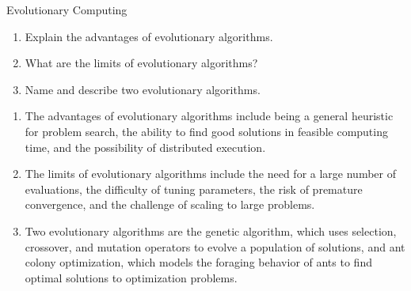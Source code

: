 \documentclass{article}
\begin{document}
\begin{exercise}{Evolutionary Computing}
  \begin{enumerate}
    \item Explain the advantages of evolutionary algorithms.
    \item What are the limits of evolutionary algorithms?
    \item Name and describe two evolutionary algorithms.
  \end{enumerate}

  \begin{solution}
    \begin{enumerate}
      \item The advantages of evolutionary algorithms include being a general heuristic for problem search, the ability to find good solutions in feasible computing time, and the possibility of distributed execution.
      \item The limits of evolutionary algorithms include the need for a large number of evaluations, the difficulty of tuning parameters, the risk of premature convergence, and the challenge of scaling to large problems.
      \item Two evolutionary algorithms are the genetic algorithm, which uses selection, crossover, and mutation operators to evolve a population of solutions, and ant colony optimization, which models the foraging behavior of ants to find optimal solutions to optimization problems.
    \end{enumerate}
  \end{solution}
\end{exercise}
\end{document}
